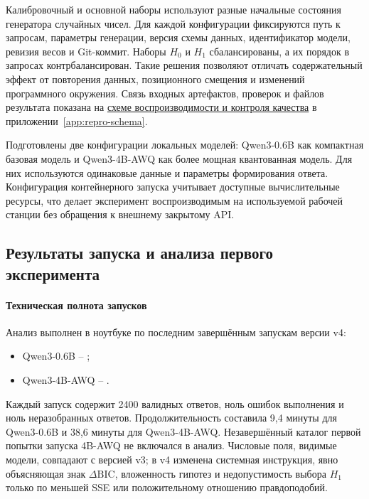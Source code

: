 \documentclass[a4paper,14pt]{extarticle}
\newcommand{\Hnull}{\ensuremath{H_0}}
\newcommand{\Hone}{\ensuremath{H_1}}
\newcommand{\DeltaBIC}{\ensuremath{\Delta\mathrm{BIC}}}
\begin{document}
Калибровочный и основной наборы используют разные начальные состояния генератора случайных чисел. Для каждой конфигурации фиксируются путь к запросам, параметры генерации, версия схемы данных, идентификатор модели, ревизия весов и Git-коммит. Наборы \Hnull{} и \Hone{} сбалансированы, а их порядок в запросах контрбалансирован. Такие решения позволяют отличать содержательный эффект от повторения данных, позиционного смещения и изменений программного окружения. Связь входных артефактов, проверок и файлов результата показана на \hyperref[fig:repro-schema]{схеме воспроизводимости и контроля качества} в приложении~\ref{app:repro-schema}.

Подготовлены две конфигурации локальных моделей: Qwen3-0.6B как компактная базовая модель и Qwen3-4B-AWQ как более мощная квантованная модель. Для них используются одинаковые данные и параметры формирования ответа. Конфигурация контейнерного запуска учитывает доступные вычислительные ресурсы, что делает эксперимент воспроизводимым на используемой рабочей станции без обращения к внешнему закрытому API.

\subsection{Результаты запуска и анализа первого эксперимента}

\paragraph{Техническая полнота запусков}

Анализ выполнен в ноутбуке  по последним завершённым запускам версии v4:

\begin{itemize}
  \item Qwen3-0.6B -- ;
  \item Qwen3-4B-AWQ -- .
\end{itemize}

Каждый запуск содержит 2400 валидных ответов, ноль ошибок выполнения и ноль неразобранных ответов. Продолжительность составила 9,4 минуты для Qwen3-0.6B и 38,6 минуты для Qwen3-4B-AWQ. Незавершённый каталог первой попытки запуска 4B-AWQ не включался в анализ. Числовые поля, видимые модели, совпадают с версией v3; в v4 изменена системная инструкция, явно объясняющая знак \DeltaBIC{}, вложенность гипотез и недопустимость выбора \Hone{} только по меньшей SSE или положительному отношению правдоподобий.
\end{document}
